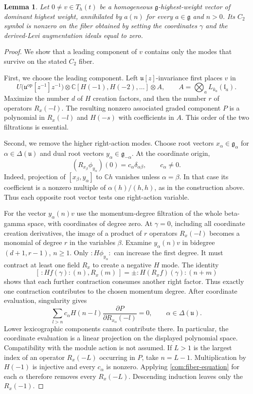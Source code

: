 \documentclass[11pt,a4paper]{amsart}
\numberwithin{equation}{section}
\newtheorem{lemma}[theorem]{Lemma}
\theoremstyle{definition}
\theoremstyle{remark}
\newcommand{\C}{\mathbb C}
\newcommand{\g}{\mathfrak g}
\newcommand{\uu}{\mathfrak u}
\newcommand{\lev}{\mathfrak l}
\begin{document}
\begin{lemma}\label{com:leading-fiber}
Let $0\ne v\in T_h(t)$ be a homogeneous $\g$-highest-weight
vector of dominant highest weight, annihilated by $a(n)$ for every
$a\in\g$ and $n>0$. Its $C_2$ symbol is nonzero on
the fiber obtained by setting the coordinates $\gamma$ and the
derived-Levi augmentation ideals equal to zero.
\end{lemma}
\begin{proof}
We show that a leading component of $v$ contains only the modes that
survive on the stated $C_2$ fiber.

First, we choose the leading component.
Left $\uu[z]$-invariance first places $v$ in
$$
 U\bigl(\uu^{\mathrm{op}}[z^{-1}]z^{-1}\bigr)
 \otimes\C[H(-1),H(-2),\ldots]\otimes A,
 \qquad A=\bigotimes_a L_{k_a}(\lev_a).
$$
Maximize the number $d$ of $H$ creation factors, and then the number $r$ of operators $R_x(-l)$. The resulting nonzero associated graded
component $P$ is a polynomial in $R_x(-l)$ and $H(-s)$ with
coefficients in $A$. This order of the two filtrations is essential.

Second, we remove the higher right-action modes. 
Choose root vectors $x_\alpha\in\g_\alpha$ for
$\alpha\in\Delta(\uu)$ and dual root vectors
$y_\alpha\in\g_{-\alpha}$. At the coordinate origin,
$$
 (R_{x_\beta}\phi_{y_\alpha})(0)
       =c_\alpha\delta_{\alpha\beta},\qquad c_\alpha\ne0.
$$
Indeed, projection of $[x_\beta,y_\alpha]$ to $\C h$ vanishes
unless $\alpha=\beta$. In that case its coefficient is a nonzero
multiple of $\alpha(h)/(h,h)$, as in the construction above.
Thus each opposite root vector tests one right-action variable.

For the vector $y_\alpha(n)v$ use the momentum-degree filtration of the
whole beta-gamma space, with coordinates of degree zero.
At $\gamma=0$, including all coordinate creation derivatives, the image of a product of $r$ operators $R_x(-l)$ becomes
a monomial of degree $r$ in the variables $\beta$. Examine
$y_\alpha(n)v$ in bidegree $(d+1,r-1)$, $n\ge1$.
Only $:H\phi_{y_\alpha}:$ can increase the first degree. It must contract
at least one field $R_x$ to create a negative $H$ mode. The
identity
$$
 [\,:Hf(\gamma):(n),R_x(m)\,]
                  =\pm:H(R_xf)(\gamma):(n+m)
$$
shows that each further contraction consumes another right factor.
Thus exactly one contraction contributes to the chosen momentum
degree. After coordinate evaluation, singularity gives
\begin{equation}\label{com:fiber-equation}
 \sum_{l>n}c_\alpha H(n-l)
                  \frac{\partial P}{\partial R_{x_\alpha}(-l)}=0,
 \qquad \alpha\in\Delta(\uu).
\end{equation}
Lower lexicographic components cannot contribute there. In particular,
the coordinate evaluation is a linear projection on the displayed
polynomial space. Compatibility with the module action is not assumed. If $L>1$ is the largest index of an operator $R_x(-L)$ occurring in $P$,
take $n=L-1$. Multiplication by $H(-1)$ is injective and every
$c_\alpha$ is nonzero. Applying \eqref{com:fiber-equation} for each
$\alpha$ therefore removes every $R_x(-L)$. Descending induction
leaves only the $R_x(-1)$.


\end{proof}
\end{document}
